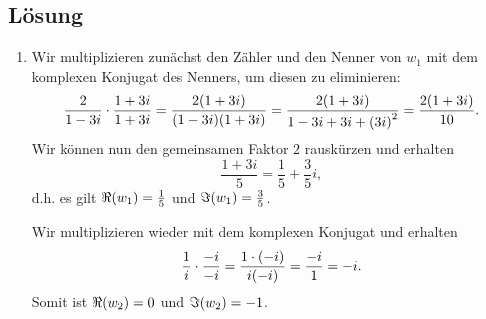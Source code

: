 \documentclass[german,12pt]{homework}
\DeclarePairedDelimiter{\enbrace}{(}{)}
\begin{document}
    \subsection*{Lösung}
    \begin{enumerate}
        \item Wir multiplizieren zunächst den Zähler und den Nenner von \(w_1\)
        mit dem komplexen Konjugat des Nenners, um diesen zu eliminieren:
        \[\frac{2}{1 - 3i} \cdot \frac{1 + 3i}{1 + 3i} = \frac{2\enbrace*{1 +
        3i}}{\enbrace*{1 - 3i}\enbrace*{1 + 3i}} = \frac{2\enbrace*{1 + 3i}}{1
        - 3i + 3i + \enbrace*{3i}^2} = \frac{2\enbrace*{1 + 3i}}{10}.\]
        Wir können nun den gemeinsamen Faktor \(2\) rauskürzen und erhalten
        \[\frac{1 + 3i}{5} = \frac{1}{5} + \frac{3}{5}i,\]
        d.h. es gilt \(\Re\enbrace*{w_1} = \frac{1}{5}\) und
        \(\Im\enbrace*{w_1} = \frac{3}{5}\).

        Wir multiplizieren wieder mit dem komplexen Konjugat und erhalten
        \[\frac{1}{i} \cdot \frac{-i}{-i} = \frac{1 \cdot \enbrace*{-
        i}}{i\enbrace*{-i}} = \frac{-i}{1} = -i.\]
        Somit ist \(\Re\enbrace*{w_2} = 0\) und \(\Im\enbrace*{w_2} = -1\).


\end{enumerate}
\end{document}
